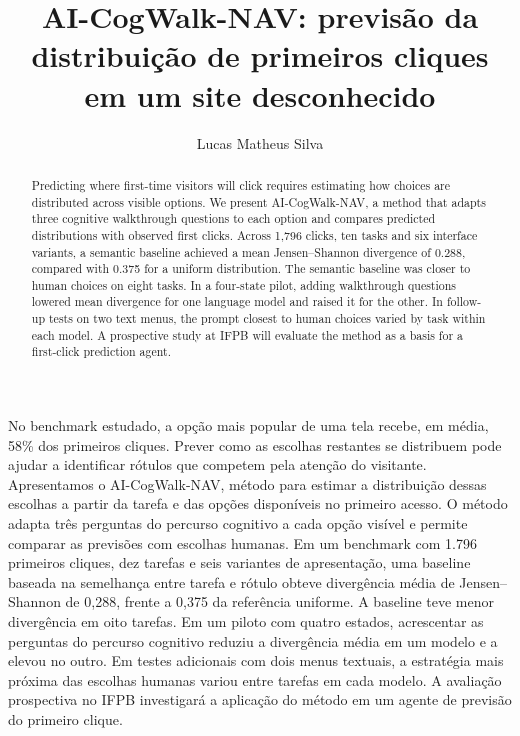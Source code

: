 \documentclass[12pt]{article}
\title{AI-CogWalk-NAV: previsão da distribuição de primeiros cliques em um site desconhecido}
\author{Lucas Matheus Silva\inst{1}}
\begin{document}
\maketitle
\raggedbottom
\begin{otherlanguage}{english}\begin{abstract}
Predicting where first-time visitors will click requires estimating how choices are distributed across visible options. We present AI-CogWalk-NAV, a method that adapts three cognitive walkthrough questions to each option and compares predicted distributions with observed first clicks. Across 1,796 clicks, ten tasks and six interface variants, a semantic baseline achieved a mean Jensen--Shannon divergence of 0.288, compared with 0.375 for a uniform distribution. The semantic baseline was closer to human choices on eight tasks. In a four-state pilot, adding walkthrough questions lowered mean divergence for one language model and raised it for the other. In follow-up tests on two text menus, the prompt closest to human choices varied by task within each model. A prospective study at IFPB will evaluate the method as a basis for a first-click prediction agent.
\end{abstract}\end{otherlanguage}
\begin{resumo}
No benchmark estudado, a opção mais popular de uma tela recebe, em média, 58\% dos primeiros cliques. Prever como as escolhas restantes se distribuem pode ajudar a identificar rótulos que competem pela atenção do visitante. Apresentamos o AI-CogWalk-NAV, método para estimar a distribuição dessas escolhas a partir da tarefa e das opções disponíveis no primeiro acesso. O método adapta três perguntas do percurso cognitivo a cada opção visível e permite comparar as previsões com escolhas humanas. Em um benchmark com 1.796 primeiros cliques, dez tarefas e seis variantes de apresentação, uma baseline baseada na semelhança entre tarefa e rótulo obteve divergência média de Jensen–Shannon de 0,288, frente a 0,375 da referência uniforme. A baseline teve menor divergência em oito tarefas. Em um piloto com quatro estados, acrescentar as perguntas do percurso cognitivo reduziu a divergência média em um modelo e a elevou no outro. Em testes adicionais com dois menus textuais, a estratégia mais próxima das escolhas humanas variou entre tarefas em cada modelo. A avaliação prospectiva no IFPB investigará a aplicação do método em um agente de previsão do primeiro clique.
\end{resumo}
\end{document}
